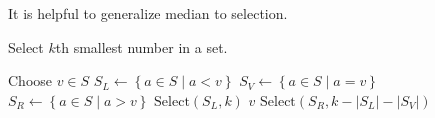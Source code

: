 It is helpful to generalize median to selection.
\begin{algorithm}
	\caption{Select \(k\)th smallest number in a set.}
	\begin{algorithmic}
		\State Choose \(v \in S\)
		\State \(S_L \leftarrow \left\{a \in S \mid a < v \right\}\)
		\State \(S_V \leftarrow \left\{a \in S \mid a = v \right\}\)
		\State \(S_R \leftarrow \left\{a \in S \mid a > v \right\}\)
			\State \Return \(\text{Select}(S_L, k)\)
		\EndIf
			\State \Return \(v\)
		\EndIf
			\State \Return \(\text{Select}(S_R, k - \left|S_L\right| - \left|S_V\right|)\)
		\EndIf
		\EndFunction
	\end{algorithmic}
\end{algorithm}
